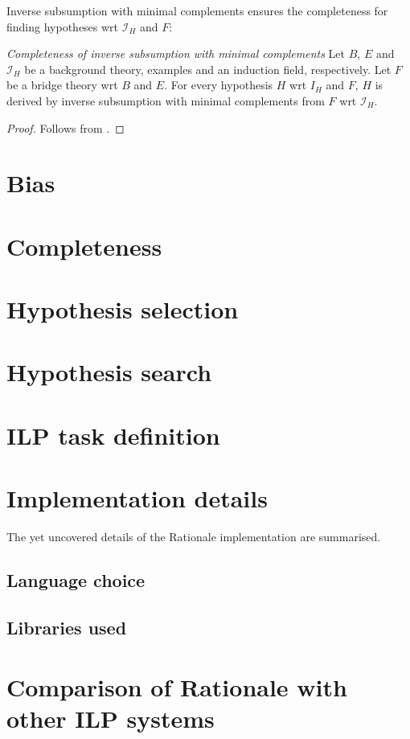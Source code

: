 Inverse subsumption with minimal complements ensures the completeness for finding
hypotheses wrt $\mathcal{I}_H$ and $F$:

\begin{thm}\emph{Completeness of inverse subsumption with minimal complements} Let $B$, $E$ and $\mathcal{I}_H$ be a background theory, examples and an induction field,
respectively. Let $F$ be a bridge theory wrt $B$ and $E$. For every hypothesis $H$ wrt $I_H$ and $F$,
$H$ is derived by inverse subsumption with minimal complements from $F$ wrt $\mathcal{I}_H$.
\end{thm}
\begin{proof}
Follows from .
\end{proof}

\section{Bias}

\section{Completeness}

\section{Hypothesis selection}

\section{Hypothesis search}

\section{ILP task definition}

\section{Implementation details}
The yet uncovered details of the Rationale implementation are summarised.

\subsection{Language choice}

\subsection{Libraries used}

\section{Comparison of Rationale with other ILP systems}